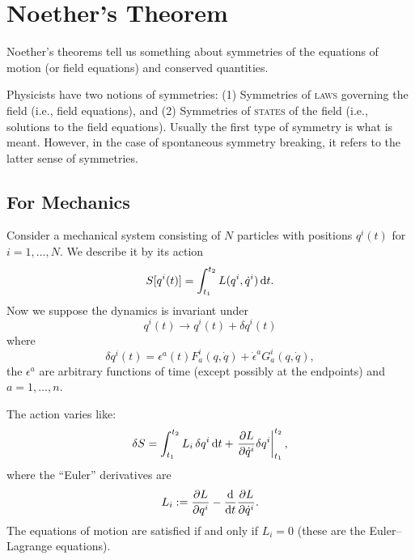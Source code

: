 \section{Noether's Theorem}

\M
Noether's theorems tell us something about symmetries of the equations
of motion (or field equations) and conserved quantities.

\begin{danger}
Physicists have two notions of symmetries: (1) Symmetries of \textsc{laws}
governing the field (i.e., field equations), and (2) Symmetries of
\textsc{states} of the field (i.e., solutions to the field equations).
Usually the first type of symmetry is what is meant. However, in the
case of spontaneous symmetry breaking, it refers to the latter sense of
symmetries. 
\end{danger}

\subsection{For Mechanics}

\M
Consider a mechanical system consisting of $N$ particles with positions
$q^{i}(t)$ for $i=1,\dots,N$. We describe it by its action
\begin{equation}
S[q^{i}(t)] = \int^{t_{2}}_{t_{1}}L(q^{i},\dot{q}^{i})\,\mathrm{d} t.
\end{equation}
Now we suppose the dynamics is invariant under
\begin{equation}
q^{i}(t)\to q^{i}(t)+\delta q^{i}(t)
\end{equation}
where
\begin{equation}\label{eq:classical-field-theory:noether:epsilon-variation}
\delta q^{i}(t) = \epsilon^{a}(t)F^{i}_{a}(q,\dot{q}) + \dot{\epsilon}^{a}
G^{i}_{a}(q,\dot{q}),
\end{equation}
the $\epsilon^{a}$ are arbitrary functions of time (except possibly at
the endpoints) and $a=1,\dots,n$.

\M The action varies like:
\begin{equation}
\delta S = \int^{t_{2}}_{t_{1}}L_{i}\,\delta q^{i}\,\mathrm{d} t
  + \left.\frac{\partial L}{\partial\dot{q}^{i}}\delta q^{i}\right|^{t_{2}}_{t_{1}},
\end{equation}
where the ``Euler'' derivatives are
\begin{equation}
L_{i} := \frac{\partial L}{\partial q^{i}}
- \frac{\mathrm{d}}{\mathrm{d} t}\frac{\partial L}{\partial\dot{q}^{i}}.
\end{equation}
The equations of motion are satisfied if and only if $L_{i}=0$ (these
are the Euler--Lagrange equations).

